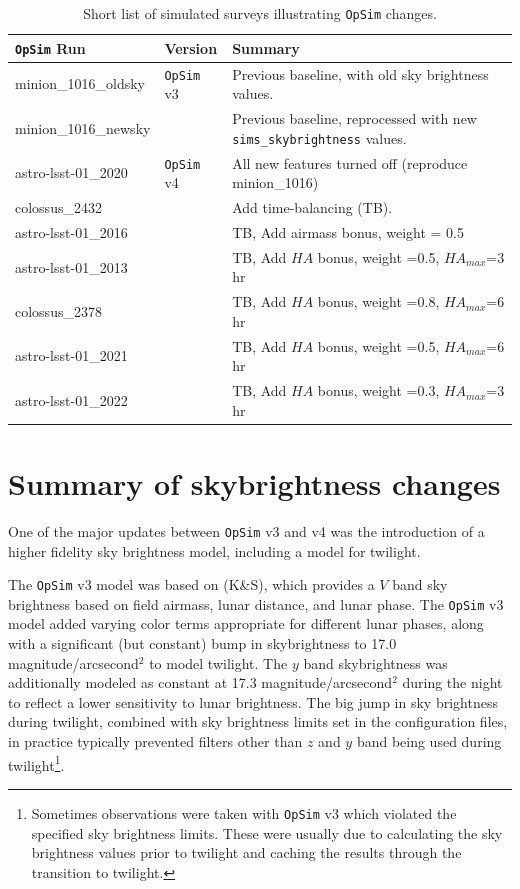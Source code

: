 \documentclass[DM,lsstdraft,authoryear,toc]{lsstdoc}
\newcommand{\opsim}{\texttt{OpSim}\xspace}
\newcommand{\simsky}{\texttt{sims\_skybrightness}\xspace}
\newcommand{\magasq}{magnitude/arcsecond$^{2}$\xspace}
\begin{document}
\begin{table}[htp]
\caption{Short list of simulated surveys illustrating \opsim changes.}
\begin{center}
\begin{tabular}{ l | l | l }
\toprule
\opsim Run & Version & Summary \\
\midrule
minion\_1016\_oldsky & \opsim v3 & Previous baseline, with old sky brightness values. \\
minion\_1016\_newsky &  & Previous baseline, reprocessed with new \simsky values.\\
astro-lsst-01\_2020 & \opsim v4  & All new features turned off (reproduce minion\_1016) \\
colossus\_2432 &  & Add time-balancing (TB).\\
astro-lsst-01\_2016 &  & TB, Add airmass bonus, weight = 0.5 \\
astro-lsst-01\_2013 &  & TB, Add $HA$ bonus, weight =0.5, $HA_{max}$=3 hr\\
colossus\_2378 &  &  TB, Add $HA$ bonus, weight =0.8, $HA_{max}$=6 hr\\
astro-lsst-01\_2021 & & TB, Add $HA$ bonus, weight =0.5, $HA_{max}$=6  hr\\
astro-lsst-01\_2022 &   & TB, Add $HA$ bonus, weight =0.3, $HA_{max}$=3 hr\\
\bottomrule
\end{tabular}
\end{center}
\label{tab:runlist}
\end{table}

\section{Summary of skybrightness changes}

One of the major updates between \opsim v3 and v4 was the introduction of a higher fidelity sky brightness model, including a model for twilight.

The \opsim v3 model was based on \citet{1991PASP..103.1033K} (K\&S), which provides a $V$ band sky brightness based on field airmass, lunar distance, and lunar phase. The \opsim v3 model added varying color terms appropriate for different lunar phases, along with a significant (but constant) bump in skybrightness to 17.0 \magasq to model twilight. The $y$ band skybrightness was additionally modeled as constant at 17.3 \magasq during the night to reflect a lower sensitivity to lunar brightness.  The big jump in sky brightness during twilight, combined with sky brightness limits set in the configuration files, in practice typically prevented filters other than $z$ and $y$ band being used during twilight\footnote{Sometimes observations were taken with \opsim v3 which violated the specified sky brightness limits. These were usually due to calculating the sky brightness values prior to twilight and caching the results through the transition to twilight.}.
\end{document}
